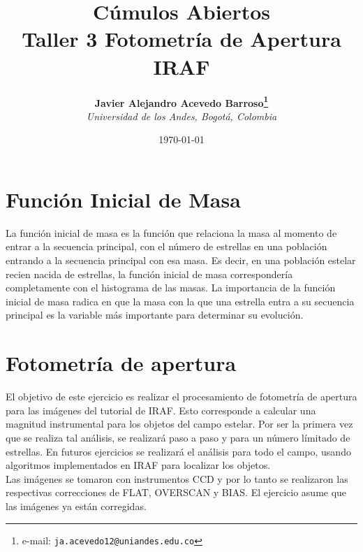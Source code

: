 \documentclass[12pt]{article}
\begin{document}
\title{Cúmulos Abiertos \\ Taller 3 Fotometría de Apertura IRAF}

\author{
\textbf{Javier Alejandro Acevedo Barroso\thanks{e-mail: \texttt{ja.acevedo12@uniandes.edu.co}}}\\
\textit{Universidad de los Andes, Bogotá, Colombia}\\
 }%

\date{\today}
\maketitle %


\normalsize
\newpage


\section{Función Inicial de Masa}
La función inicial de masa es la función que relaciona la masa al momento de entrar a la secuencia principal, con el número de estrellas en una población entrando a la secuencia principal con esa masa. Es decir, en una población estelar recien nacida de estrellas, la función inicial de masa correspondería completamente con el histograma de las masas. La importancia de la función inicial de masa radica en que la masa con la que una estrella entra a su secuencia principal es la variable más importante para determinar su evolución.\\



\section{Fotometría de apertura}
El objetivo de este ejercicio es realizar el procesamiento de fotometría de apertura para las imágenes del tutorial de IRAF. Esto corresponde a calcular una magnitud instrumental para los objetos del campo estelar. Por ser la primera vez que se realiza tal análisis, se realizará paso a paso y para un número límitado de estrellas. En futuros ejercicios se realizará el análisis para todo el campo, usando algoritmos implementados en IRAF para localizar los objetos.\\

Las imágenes se tomaron con instrumentos CCD y por lo tanto se realizaron las respectivas correcciones de FLAT, OVERSCAN y BIAS. El ejercicio asume que las imágenes ya están corregidas.\\
\end{document}
